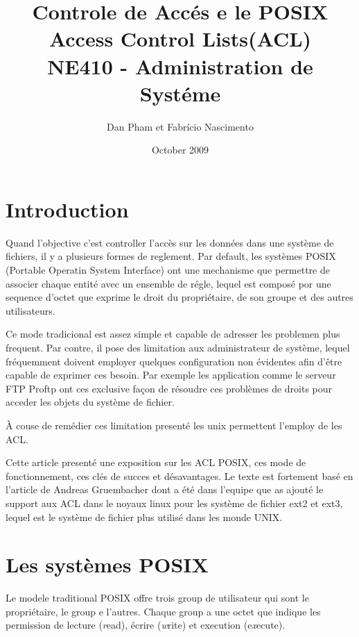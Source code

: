 \documentclass[draft]{article}
\title{\textbf{Controle de Accés e le POSIX Access Control Lists(ACL)} \\ NE410 - Administration de Systéme }
\author{Dan Pham et Fabrício Nascimento}
\date{October 2009}
\begin{document}
\maketitle
\newpage
\section*{Introduction}

Quand l'objective c'est controller l'accès sur les données dans une système de fichiers, il y a plusieurs formes de reglement. Par default, les systèmes POSIX (Portable Operatin System Interface)\cite{ieee1,ieee2} ont une mechanisme que permettre de associer chaque entité avec un ensemble de régle, lequel est composé por une sequence d'octet que exprime le droit du propriétaire, de son groupe et des autres utilisateurs. 

Ce mode tradicional est assez simple et capable de adresser les problemen plus frequent. Par contre, il pose des limitation aux administrateur de système, lequel fréquemment doivent employer quelques configuration non évidentes afin d'être capable de exprimer ces besoin. Par exemple les application comme le serveur FTP Proftp\cite{ftp} ont ces exclusive façon de résoudre ces problèmes de droits pour acceder les objets du système de fichier.

À couse de remédier ces limitation presenté les unix permettent l'employ de les ACL.   

Cette article presenté une exposition sur les ACL POSIX, ces mode de fonctionnement, ces clés de succes et désavantages. Le texte est fortement basé en l'article de Andreas Gruembacher\cite{aclsuse} dont a été dans l'equipe que as ajouté le support aux ACL dans le noyaux linux pour les système de fichier ext2 et ext3, lequel est le système de fichier plus utilisé dans les monde UNIX.

\section*{Les systèmes POSIX}

Le modele traditional POSIX offre trois group de utilisateur qui sont le propriétaire, le group e l'autres. Chaque group a une octet que indique les permission de lecture (\emph{r}ead), écrire (\emph{w}rite) et execution (e\emph{x}ecute).   
\end{document}
